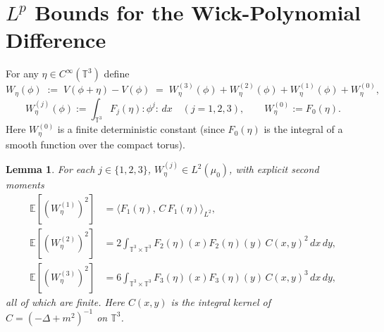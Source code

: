 \documentclass[12pt]{article}
\newtheorem{lemma}[theorem]{Lemma}
\theoremstyle{definition}
\begin{document}
\section{$L^p$ Bounds for the Wick-Polynomial Difference}

For any $\eta\in C^\infty(\mathbb{T}^3)$ define
\begin{equation}\label{eq:Wpsi}
W_\eta(\phi) \;:=\; V(\phi+\eta)-V(\phi)
\;=\; W_\eta^{(3)}(\phi) + W_\eta^{(2)}(\phi) + W_\eta^{(1)}(\phi) + W_\eta^{(0)},
\end{equation}
\begin{equation}\label{eq:Wj}
W_\eta^{(j)}(\phi) := \int_{\mathbb{T}^3} F_j(\eta)\colon\!\phi^j\!\colon\,dx\quad(j=1,2,3),
\qquad W_\eta^{(0)} := F_0(\eta).
\end{equation}
Here $W_\eta^{(0)}$ is a finite deterministic constant (since $F_0(\eta)$ is the integral of
a smooth function over the compact torus).

\begin{lemma}\label{lem:WickL2}
For each $j\in\{1,2,3\}$, $W_\eta^{(j)}\in L^2(\mu_0)$, with explicit second moments
\begin{align}
\mathbb{E}[(W_\eta^{(1)})^2] &= \langle F_1(\eta),\,C\,F_1(\eta)\rangle_{L^2},\label{eq:m1}\\
\mathbb{E}[(W_\eta^{(2)})^2] &= 2\!\int_{\mathbb{T}^3\times\mathbb{T}^3}\! F_2(\eta)(x)F_2(\eta)(y)\,C(x,y)^2\,dx\,dy,\label{eq:m2}\\
\mathbb{E}[(W_\eta^{(3)})^2] &= 6\!\int_{\mathbb{T}^3\times\mathbb{T}^3}\! F_3(\eta)(x)F_3(\eta)(y)\,C(x,y)^3\,dx\,dy,\label{eq:m3}
\end{align}
all of which are finite. Here $C(x,y)$ is the integral kernel of $C=(-\Delta+m^2)^{-1}$ on
$\mathbb{T}^3$.
\end{lemma}
\end{document}
